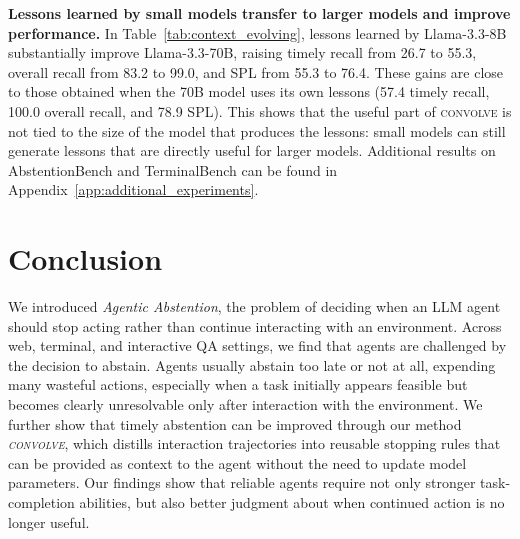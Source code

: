 \documentclass{llmxive}
\providecommand{\method}{\textsc{convolve}\xspace}
\begin{document}
\vspace{-1mm}
\textbf{Lessons learned by small models transfer to larger models and improve performance.} In Table~\ref{tab:context_evolving}, lessons learned by Llama-3.3-8B substantially improve Llama-3.3-70B, raising timely recall from 26.7 to 55.3, overall recall from 83.2 to 99.0, and SPL from 55.3 to 76.4. These gains are close to those obtained when the 70B model uses its own lessons (57.4 timely recall, 100.0 overall recall, and 78.9 SPL). This shows that the useful part of \method is not tied to the size of the model that produces the lessons: small models can still generate lessons that are directly useful for larger models. Additional results on AbstentionBench and TerminalBench can be found in Appendix~\ref{app:additional_experiments}.



\vspace{-2mm}
\section{Conclusion}
\vspace{-2mm}

We introduced \textit{Agentic Abstention}, the problem of deciding when an LLM agent should stop acting rather than continue interacting with an environment. Across web, terminal, and interactive QA settings, we find that agents are challenged by the decision to abstain. Agents usually abstain too late or not at all, expending many wasteful actions, especially when a task initially appears feasible but becomes clearly unresolvable only after interaction with the environment. We further show that timely abstention can be improved through our method \textit{\method}, which distills interaction trajectories into reusable stopping rules that can be provided as context to the agent without the need to update model parameters. Our findings show that reliable agents require not only stronger task-completion abilities, but also better judgment about when continued action is no longer useful.

\end{document}
